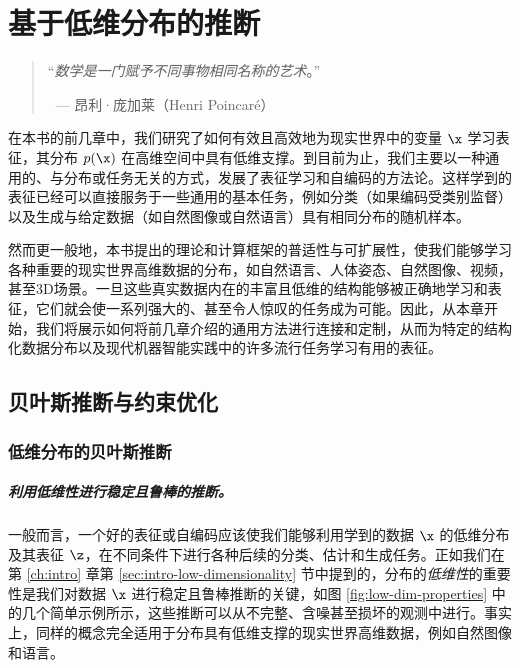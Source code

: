 \documentclass[../../book-main_zh.tex]{subfiles}
\begin{document}
\chapter{基于低维分布的推断}
\label{ch:conditional-inference}

\begin{quote}

    \hfill    ``{\em 数学是一门赋予不同事物相同名称的艺术}。''

    $~$ \hfill --- 昂利·庞加莱（Henri Poincaré）
\end{quote}
\vspace{5mm}

在本书的前几章中，我们研究了如何有效且高效地为现实世界中的变量 $\x$ 学习表征，其分布 $p(\x)$ 在高维空间中具有低维支撑。到目前为止，我们主要以一种通用的、与分布或任务无关的方式，发展了表征学习和自编码的方法论。这样学到的表征已经可以直接服务于一些通用的基本任务，例如分类（如果编码受类别监督）以及生成与给定数据（如自然图像或自然语言）具有相同分布的随机样本。

然而更一般地，本书提出的理论和计算框架的普适性与可扩展性，使我们能够学习各种重要的现实世界高维数据的分布，如自然语言、人体姿态、自然图像、视频，甚至3D场景。一旦这些真实数据内在的丰富且低维的结构能够被正确地学习和表征，它们就会使一系列强大的、甚至令人惊叹的任务成为可能。因此，从本章开始，我们将展示如何将前几章介绍的通用方法进行连接和定制，从而为特定的结构化数据分布以及现代机器智能实践中的许多流行任务学习有用的表征。

\section{贝叶斯推断与约束优化}

\subsection{低维分布的贝叶斯推断}
\paragraph{利用低维性进行稳定且鲁棒的推断。}
一般而言，一个好的表征或自编码应该使我们能够利用学到的数据 $\x$ 的低维分布及其表征 $\z$，在不同条件下进行各种后续的分类、估计和生成任务。正如我们在第 \ref{ch:intro} 章第 \ref{sec:intro-low-dimensionality} 节中提到的，分布的{\em 低维性}的重要性是我们对数据 $\x$ 进行稳定且鲁棒推断的关键，如图 \ref{fig:low-dim-properties} 中的几个简单示例所示，这些推断可以从不完整、含噪甚至损坏的观测中进行。事实上，同样的概念完全适用于分布具有低维支撑的现实世界高维数据，例如自然图像和语言。
\end{document}
